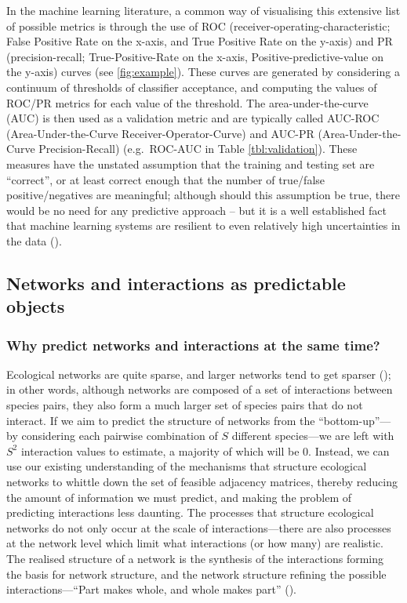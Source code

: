 \begin{refsection}
In the machine learning literature, a common way of visualising this
extensive list of possible metrics is through the use of ROC
(receiver-operating-characteristic; False Positive Rate on the x-axis,
and True Positive Rate on the y-axis) and PR (precision-recall;
True-Positive-Rate on the x-axis, Positive-predictive-value on the
y-axis) curves (see \autoref{fig:example}). These curves are generated by
considering a continuum of thresholds of classifier acceptance, and
computing the values of ROC/PR metrics for each value of the threshold.
The area-under-the-curve (AUC) is then used as a validation metric and
are typically called AUC-ROC (Area-Under-the-Curve
Receiver-Operator-Curve) and AUC-PR (Area-Under-the-Curve
Precision-Recall) (e.g.~ROC-AUC in Table \ref{tbl:validation}). These measures have
the unstated assumption that the training and testing set are
``correct'', or at least correct enough that the number of true/false
positive/negatives are meaningful; although should this assumption be
true, there would be no need for any predictive approach -- but it is a
well established fact that machine learning systems are resilient to
even relatively high uncertainties in the data (\cite{Halevy2009Unreasonable}).

\subsection{Networks and interactions as predictable
objects}\label{networks-and-interactions-as-predictable-objects}

\subsubsection{Why predict networks and interactions at the same
time?}\label{why-predict-networks-and-interactions-at-the-same-time}

Ecological networks are quite sparse, and larger networks tend to get
sparser (\cite{MacDonald2020Revisiting}); in other words, although networks
are composed of a set of interactions between species pairs, they also
form a much larger set of species pairs that do not interact. If we aim
to predict the structure of networks from the ``bottom-up''--- by
considering each pairwise combination of \(S\) different species---we
are left with \(S^2\) interaction values to estimate, a majority of
which will be 0. Instead, we can use our existing understanding of the
mechanisms that structure ecological networks to whittle down the set of
feasible adjacency matrices, thereby reducing the amount of information
we must predict, and making the problem of predicting interactions less
daunting. The processes that structure ecological networks do not only
occur at the scale of interactions---there are also processes at the
network level which limit what interactions (or how many) are realistic.
The realised structure of a network is the synthesis of the interactions
forming the basis for network structure, and the network structure
refining the possible interactions---``Part makes whole, and whole makes
part'' (\cite{Levins1987DiaBio}).


\end{refsection}
